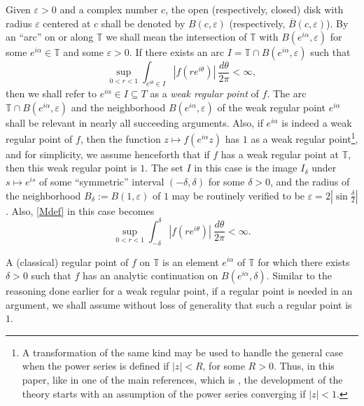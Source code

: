 \documentclass[11pt,a4paper]{article}
\newcommand{\T}{\mathbb{T}}
\def\sub{\subseteq}
\def\sub{\subseteq}
\def\Bbar{\overline{B}}
\begin{document}
Given $\varepsilon>0$ and a complex number $c$, the open (respectively, closed) disk with radius $\varepsilon$ centered at $c$ shall be denoted by $B(c,\varepsilon)$ (respectively, $\Bbar(c,\varepsilon)$). By an ``arc'' on or along $\T$ we shall mean the intersection of $\T$ with $B(e^{i\alpha},\varepsilon)$ for some $e^{i\alpha}\in\T$ and some $\varepsilon>0$. 
If there exists an arc $I=\T\cap B(e^{i\alpha},\varepsilon)$ such that
\begin{equation}
\sup_{0<r<1}\int_{e^{i\theta}\in I}|f(re^{i\theta})|\ \frac{d\theta}{2\pi}<\infty,\label{Mdef}
\end{equation}
then we shall refer to $e^{i\alpha}\in I\sub T$ as a \emph{weak regular  point} of $f$. The arc $\T\cap B(e^{i\alpha},\varepsilon)$ and the neighborhood $B(e^{i\alpha},\varepsilon)$ of the weak regular point $e^{i\alpha}$ shall be relevant in nearly all succeeding arguments. Also, if $e^{i\alpha}$ is indeed a weak regular point of $f$, then the function $z\mapsto f(e^{i\alpha}z)$ has $1$ as a weak regular point\footnote{A transformation of the same kind may be used to handle the general case when the power series is defined if $|z|<R$, for some $R>0$. Thus, in this paper, like in one of the main references, which is \cite{bre11}, the development of the  theory starts with an assumption of the power series converging if $|z|<1$.}, and for simplicity, we assume henceforth that if $f$ has a weak regular point at $\T$, then this weak regular point is $1$. The set $I$ in this case is the image $I_\delta$ under $s\mapsto e^{is}$ of some ``symmetric'' interval $(-\delta,\delta)$ for some $\delta>0$, and the radius of the neighborhood $B_\delta:=B(1,\varepsilon)$ of $1$ may be routinely verified to be $\varepsilon=2\left|\sin\frac{\delta}{2}\right|$. Also, \eqref{Mdef} in this case becomes
\begin{equation}
\sup_{0<r<1}\int_{-\delta}^\delta|f(re^{i\theta})|\ \frac{d\theta}{2\pi}<\infty.\label{Mdef2}
\end{equation}

A (classical) regular point of $f$ on $\T$ is an element $e^{i\alpha}$ of $\T$ for which there exists $\delta>0$ such that $f$ has an analytic continuation on $B(e^{i\alpha},\delta)$. Similar to the reasoning done earlier for a weak regular point, if a regular point is needed in an argument, we shall assume without loss of generality that such a regular point is $1$.
\end{document}
